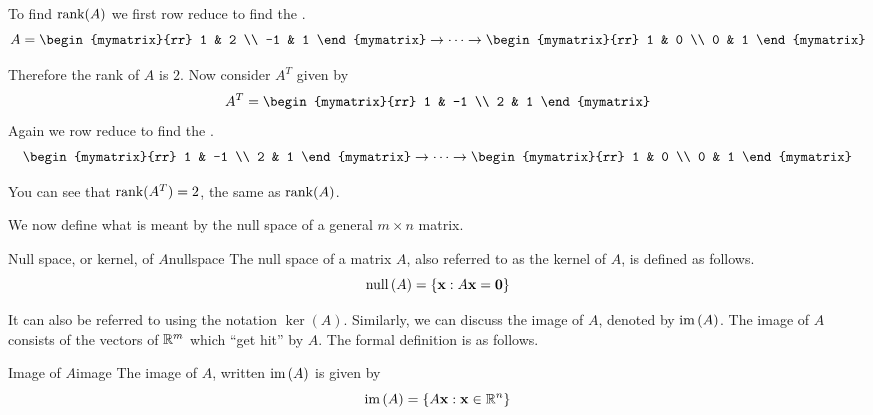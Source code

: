 \begin{solution}
To find $\mbox{rank}(A)$ we first row reduce to find the {\rref}.
\[
A = 
\begin{mymatrix}{rr}
1 & 2 \\
-1 & 1 
\end{mymatrix}
\rightarrow \cdots \rightarrow
\begin{mymatrix}{rr}
1 & 0 \\
0 & 1 
\end{mymatrix}
\]

Therefore the rank of $A$ is $2$. Now consider $A^T$ given by 
\[
A^T = \begin{mymatrix}{rr}
1 & -1 \\
2 & 1 
\end{mymatrix}
\]
Again we row reduce to find the {\rref}.
\[
\begin{mymatrix}{rr}
1 & -1 \\
2 & 1 
\end{mymatrix}
\rightarrow \cdots \rightarrow
\begin{mymatrix}{rr}
1 & 0 \\
0 & 1 
\end{mymatrix}
\]

You can see that $\mbox{rank}(A^T) = 2$, the same as $\mbox{rank}(A)$. 
\end{solution}

We now define what is meant by the null space of a general $m\times n$ matrix.

\begin{definition}{Null space, or kernel, of $A$}{nullspace}
The null space of a matrix $A$, also referred to as the kernel of $A$, 
is defined as follows.%
\begin{equation*}
\mbox{null} \left( A\right) =\left\{ {\bf x} :A {\bf x} ={\bf 0}\right\}
\end{equation*}
\end{definition}

It can also be referred to using the notation $\ker \left(
A\right) $. 
Similarly, we can discuss the image of $A$, denoted by
$\mbox{im}\left( A\right)$. The image of $A$ consists of the vectors
of $\mathbb{R}^{m}$ which ``get hit'' by $A$.  The formal definition
is as follows.

\begin{definition}{Image of $A$}{image}
The image of $A$, written $\mbox{im}\left( A\right)$ is given by
\[
\mbox{im}\left( A \right) = \left\{ A{\bf x} : {\bf x} \in \mathbb{R}^n \right\}
\]
\end{definition}

